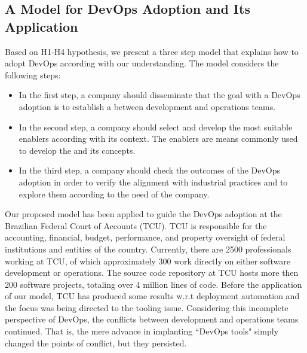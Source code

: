 \subsection{A Model for DevOps Adoption and Its Application}\label{sec:case_study}

Based on H1-H4 hypothesis, we present a three step model that
explains how to adopt DevOps according with our understanding. The
model considers the following steps:

\begin{itemize}
\item In the first step, a company should
disseminate that the goal with a DevOps adoption is to
establish a \cc between
development and operations teams.

\item In the second step, a company should select and develop
the most suitable enablers according with its context. The enablers
are means commonly used to develop the \cc
and its concepts.

\item In the third step, a company should check the outcomes of the
DevOps adoption in order to verify the alignment with
industrial practices and to explore them according to the
need of the company.
\end{itemize}

Our proposed model has been applied to guide the DevOps adoption at the Brazilian Federal Court of
Accounts (TCU). TCU is responsible for the accounting, financial, budget, performance, and property
oversight of federal institutions and entities of the country. Currently, there are 2500
professionals working at TCU, of which approximately 300 work directly on either
software development or operations. The source code repository at TCU hosts more then 200 software projects, totaling
over 4 million lines of code.
Before the application of our model, TCU has produced some results w.r.t deployment
automation and the focus was being directed to the tooling issue. Considering this
incomplete perspective of DevOps, the conflicts between development and operations
teams continued. That is, the mere advance in implanting ``DevOps tools" simply
changed the points of conflict, but they persisted.

